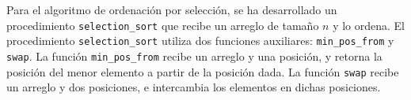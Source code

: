 Para el algoritmo de ordenación por selección, se ha desarrollado un procedimiento \texttt{selection\_sort} que recibe un arreglo de tamaño $n$ y lo ordena. El procedimiento \texttt{selection\_sort} utiliza dos funciones auxiliares: \texttt{min\_pos\_from} y \texttt{swap}. La función \texttt{min\_pos\_from} recibe un arreglo y una posición, y retorna la posición del menor elemento a partir de la posición dada. La función \texttt{swap} recibe un arreglo y dos posiciones, e intercambia los elementos en dichas posiciones. 